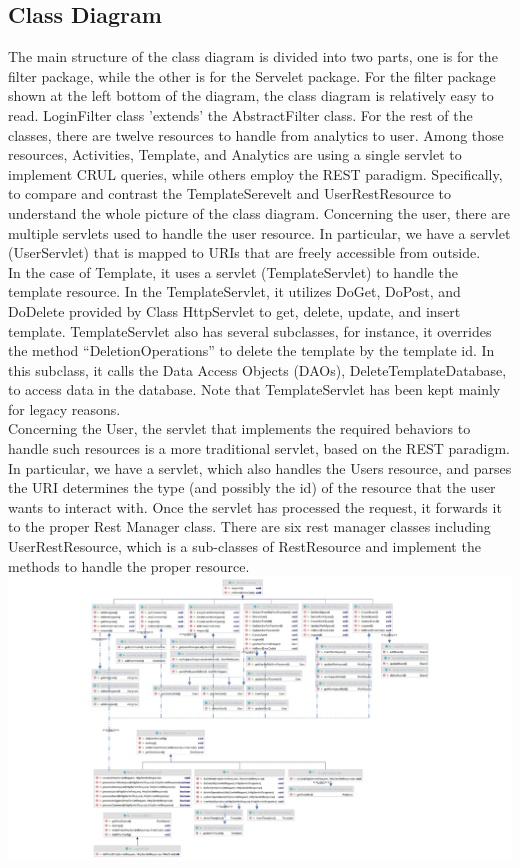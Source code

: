 \subsection{Class Diagram}


The main structure of the class diagram is divided into two parts, one is for the filter package, while the other is for the Servelet package. 
For the filter package shown at the left bottom of the diagram, the class diagram is relatively easy to read. LoginFilter class 'extends' the AbstractFilter class.
For the rest of the classes, there are twelve resources to handle from analytics to user. Among those resources, Activities, Template, and Analytics are using 
a single servlet to implement CRUL queries, while others employ the REST paradigm. Specifically, to compare and contrast the TemplateSerevelt and 
UserRestResource to understand the whole picture of the class diagram. 
Concerning the user, there are multiple servlets used to handle the user
resource. In particular, we have a servlet (UserServlet) that is mapped to URIs that are freely accessible from
outside.\\

In the case of Template, it uses a servlet (TemplateServlet) to handle the template
resource. In the TemplateServlet, it utilizes DoGet, DoPost, and DoDelete provided by
Class HttpServlet to get, delete, update, and insert template. TemplateServlet also has several subclasses, for instance, it overrides the
method “DeletionOperations” to delete the template by the template id. In this subclass, it calls the Data Access Objects (DAOs), 
DeleteTemplateDatabase, to access data in the database. Note that TemplateServlet
has been kept mainly for legacy reasons.\\

Concerning the User, the servlet that implements the required behaviors to handle such resources is a more traditional servlet, based on the
REST paradigm. In particular, we have a servlet, which also handles the Users resource, and parses the
URI determines the type (and possibly the id) of the resource that the user wants to interact with. Once the
servlet has processed the request, it forwards it to the proper Rest Manager class. There are six rest manager
classes including UserRestResource, which is a sub-classes of RestResource and implement the
methods to handle the proper resource.\\
\includegraphics[width=1.30\columnwidth]{WA-workflix-HW1/images/class sequence.jpg}\\

